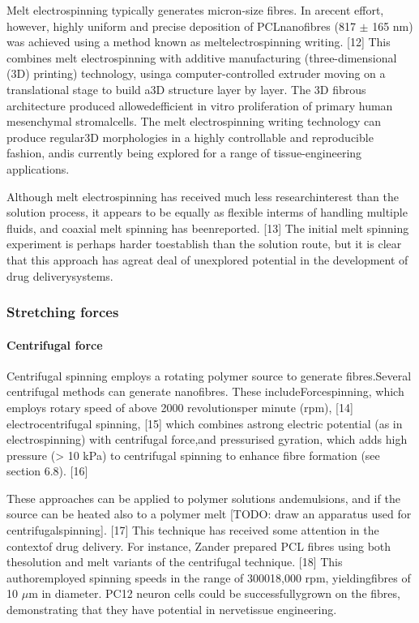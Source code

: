 \documentclass[5p,,preprint,12pt,twocolumn]{elsarticle}
\begin{document}
Melt electrospinning typically generates micron-size fibres. In arecent effort, however, highly uniform and precise deposition of PCLnanofibres (817 \ensuremath{\pm} 165 nm) was achieved using a method known as meltelectrospinning writing. [12] This combines melt electrospinning with additive manufacturing (three-dimensional (3D) printing) technology, usinga computer-controlled extruder moving on a translational stage to build a3D structure layer by layer. The 3D fibrous architecture produced allowedefficient in vitro proliferation of primary human mesenchymal stromalcells. The melt electrospinning writing technology can produce regular3D morphologies in a highly controllable and reproducible fashion, andis currently being explored for a range of tissue-engineering applications.

Although melt electrospinning has received much less researchinterest than the solution process, it appears to be equally as flexible interms of handling multiple fluids, and coaxial melt spinning has beenreported. [13] The initial melt spinning experiment is perhaps harder toestablish than the solution route, but it is clear that this approach has agreat deal of unexplored potential in the development of drug deliverysystems.



\subsubsection{Stretching forces}



\paragraph{Centrifugal force}Centrifugal spinning employs a rotating polymer source to generate fibres.Several centrifugal methods can generate nanofibres. These includeForcespinning, which employs rotary speed of above 2000 revolutionsper minute (rpm), [14] electrocentrifugal spinning, [15] which combines astrong electric potential (as in electrospinning) with centrifugal force,and pressurised gyration, which adds high pressure ({\textgreater} 10 kPa) to centrifugal spinning to enhance fibre formation (see section 6.8). [16]

These approaches can be applied to polymer solutions andemulsions, and if the source can be heated also to a polymer melt [TODO: draw an apparatus used for centrifugalspinning]. [17] This technique has received some attention in the contextof drug delivery. For instance, Zander prepared PCL fibres using both thesolution and melt variants of the centrifugal technique. [18] This authoremployed spinning speeds in the range of 3000{\textendash}18,000 rpm, yieldingfibres of 10 \ensuremath{\mu }m in diameter. PC12 neuron cells could be successfullygrown on the fibres, demonstrating that they have potential in nervetissue engineering.
\end{document}
